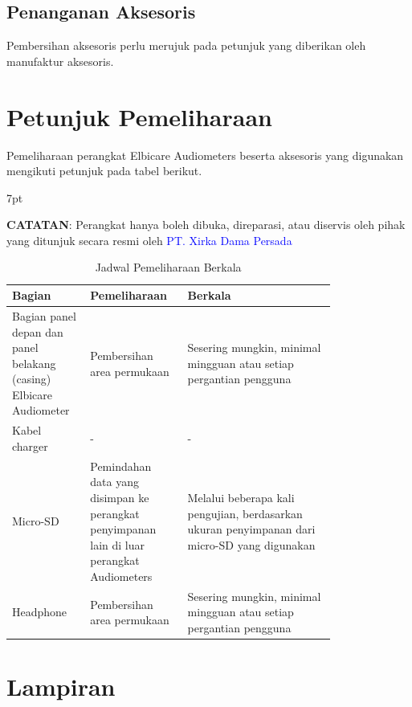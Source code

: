 \documentclass[11pt,a4paper,twoside,onecolumn]{book}
\newenvironment{formalblue}{%
	\def\FrameCommand{%
		\hspace{1pt}%
		{\color{blue}\vrule width 2pt}%
		{\color{formalshade}\vrule width 4pt}%
		\colorbox{formalshade}%
	}%
	\MakeFramed{\advance\hsize-\width\FrameRestore}%
	\noindent\hspace{-4.55pt}%
	\begin{adjustwidth}{}{7pt}%
		\vspace{2pt}\vspace{2pt}%
	}
	{%
		\vspace{2pt}\end{adjustwidth}\endMakeFramed%
}
\begin{document}
		\section{Penanganan Aksesoris}
		Pembersihan aksesoris perlu merujuk pada petunjuk yang diberikan oleh manufaktur aksesoris. 
	\newpage
	
	\chapter{Petunjuk Pemeliharaan}
	Pemeliharaan perangkat Elbicare Audiometers beserta aksesoris yang digunakan mengikuti petunjuk pada tabel berikut.
	\begin{formalblue}
		 \textbf{CATATAN}:
		Perangkat hanya boleh dibuka, direparasi, atau diservis oleh pihak yang ditunjuk secara resmi oleh \textcolor{blue}{PT. Xirka Dama Persada} 
	\end{formalblue}

	\begin{table}[H]
		\centering
		\caption{Jadwal Pemeliharaan Berkala}
		\label{tab:7.2}
		\begin{tabular}{|p{0.2\linewidth}  | p{0.2\linewidth}| p{0.4\linewidth}|}
			\hline
			Bagian & Pemeliharaan & Berkala\\
			\hline
			\hline
			Bagian panel depan dan panel belakang (casing) Elbicare Audiometer & Pembersihan area permukaan & Sesering mungkin, minimal mingguan atau setiap pergantian pengguna\\
			\hline
			Kabel charger & - & -\\
			\hline
			Micro-SD & Pemindahan data yang disimpan ke perangkat penyimpanan lain di luar perangkat Audiometers & Melalui beberapa kali pengujian, berdasarkan ukuran penyimpanan dari micro-SD yang digunakan\\
			\hline
			Headphone & Pembersihan area permukaan & Sesering mungkin, minimal mingguan atau setiap pergantian pengguna\\
			\hline
		\end{tabular}
	\end{table}

	\newpage
	
	\chapter{Lampiran}
\end{document}
